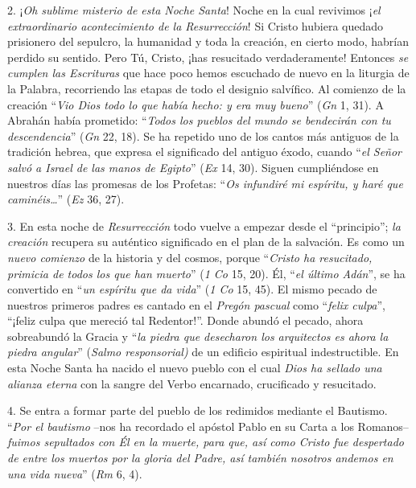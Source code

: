 			\begin{body}2. ¡\textit{Oh sublime misterio de esta Noche Santa}! Noche en la cual revivimos ¡\textit{el extraordinario acontecimiento de la Resurrección}! Si Cristo hubiera quedado prisionero del sepulcro, la humanidad y toda la creación, en cierto modo, habrían perdido su sentido. Pero Tú, Cristo, ¡has resucitado verdaderamente! Entonces\textit{ se cumplen las Escrituras} que hace poco hemos escuchado de nuevo en la liturgia de la Palabra, recorriendo las etapas de todo el designio salvífico. Al comienzo de la creación “\textit{Vio Dios todo lo que había hecho: y era muy bueno}” (\textit{Gn} 1, 31). A Abrahán había prometido: “\textit{Todos los pueblos del mundo se bendecirán con tu descendencia}” (\textit{Gn} 22, 18). Se ha repetido uno de los cantos más antiguos de la tradición hebrea, que expresa el significado del antiguo éxodo, cuando “\textit{el Señor salvó a Israel de las manos de Egipto}” (\textit{Ex} 14, 30). Siguen cumpliéndose en nuestros días las promesas de los Profetas: “\textit{Os infundiré mi espíritu, y haré que caminéis…}” (\textit{Ez }36, 27).\end{body}
			
			\begin{body}3. En esta noche de \textit{Resurrección} todo vuelve a empezar desde el “principio”; \textit{la creación} recupera su auténtico significado en el plan de la salvación. Es como un \textit{nuevo comienzo }de la historia y del cosmos, porque “\textit{Cristo ha resucitado, primicia de todos los que han muerto}” (\textit{1 Co} 15, 20). Él, “\textit{el último Adán}”, se ha convertido en “\textit{un espíritu que da vida}” (\textit{1 Co} 15, 45). El mismo pecado de nuestros primeros padres es cantado en el \textit{Pregón pascual} como “\textit{felix culpa}”, “¡feliz culpa que mereció tal Redentor!”. Donde abundó el pecado, ahora sobreabundó la Gracia y “\textit{la piedra que desecharon los arquitectos es ahora la piedra angular}” (\textit{Salmo responsorial)} de un edificio espiritual indestructible. En esta Noche Santa ha nacido el nuevo pueblo con el cual \textit{Dios ha sellado una alianza eterna} con la sangre del Verbo encarnado, crucificado y resucitado.\end{body}
			
			\begin{body}4. Se entra a formar parte del pueblo de los redimidos mediante el Bautismo. “\textit{Por el bautismo} –nos ha recordado el apóstol Pablo en su Carta a los Romanos– \textit{fuimos sepultados con Él en la muerte, para que, así como Cristo fue despertado de entre los muertos por la gloria del Padre, así también nosotros andemos en una vida nueva}” (\textit{Rm} 6, 4).\end{body}
			
